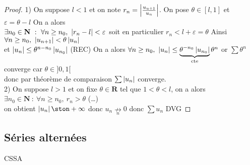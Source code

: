 		\begin{proof}
			{\small 1)} On suppose $l<1$ et on note $r_n = \left\vert \frac{u_{u+1}}{u_n} \right\vert$. On pose $\theta \in [l,1] $ et $\varepsilon = \theta -l$
			On a alors \\ $\exists n_0 \in \mathbf{N} ~:~ \forall n\geq n_0 ,~\left\vert r_n -l \right\vert <\varepsilon$  soit en particulier $r_n < l+\varepsilon 
			=\theta$ Ainsi $\forall n\geq n_0 ,~\left\vert u_{n+1} \right\vert < \theta\left\vert u_n \right\vert$ \\ et $ \left\vert u_n \right\vert \leq \theta^{n-n_0} \left\vert u_{n_0} \right\vert$ {\small (REC) }
			On a alors $\forall n\geq n_0 ,~\left\vert u_n \right\vert \leq \underbrace{\theta^{-n_0} \left\vert u_{n_0} \right\vert}_{\mathrm{cte}} \theta^n$ 
			or $\sum\theta^n$ converge car $\theta \in ]0,1[$ \\donc par théorème de comparaison $\sum \left\vert u_n \right\vert $ converge.
			\vspace*{0.2cm}\\ {\small 2)} On suppose $l>1$ et on fixe $\theta \in \mathbf{R}$ tel que $ 1<\theta <l$, 
			on a alors $\exists n_0 \in \mathbf{N} ~:~\forall n\geq n_0 ,~r_n > \theta$ (\dots)\\
			on obtient $\abs{u_n} \ston +\infty$ donc $u_n \underset{n}{\nrightarrow} 0$ donc $\sum u_n$ DVG
		\end{proof}
	
	\subsection{Séries alternées}
		

		{CSSA}


